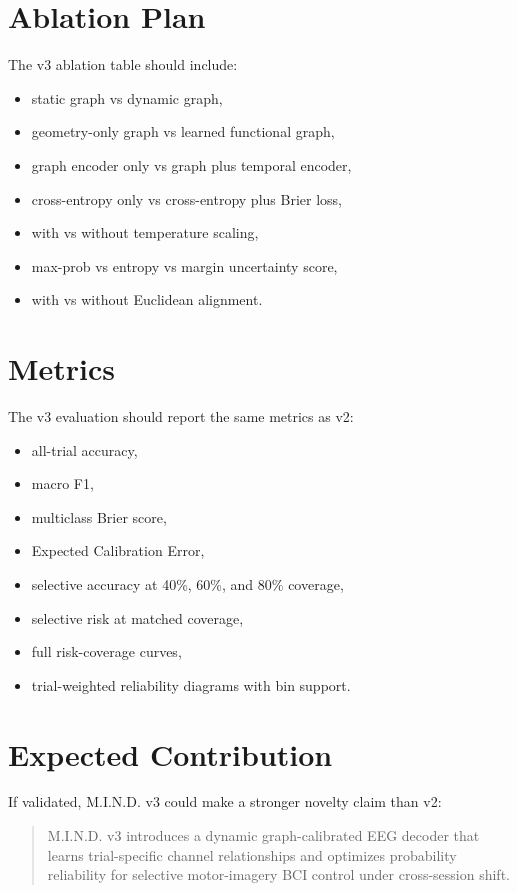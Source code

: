 \documentclass[11pt]{article}
\begin{document}
\section{Ablation Plan}

The v3 ablation table should include:
\begin{itemize}
  \item static graph vs dynamic graph,
  \item geometry-only graph vs learned functional graph,
  \item graph encoder only vs graph plus temporal encoder,
  \item cross-entropy only vs cross-entropy plus Brier loss,
  \item with vs without temperature scaling,
  \item max-prob vs entropy vs margin uncertainty score,
  \item with vs without Euclidean alignment.
\end{itemize}

\section{Metrics}

The v3 evaluation should report the same metrics as v2:
\begin{itemize}
  \item all-trial accuracy,
  \item macro F1,
  \item multiclass Brier score,
  \item Expected Calibration Error,
  \item selective accuracy at 40\%, 60\%, and 80\% coverage,
  \item selective risk at matched coverage,
  \item full risk-coverage curves,
  \item trial-weighted reliability diagrams with bin support.
\end{itemize}

\section{Expected Contribution}

If validated, M.I.N.D. v3 could make a stronger novelty claim than v2:
\begin{quote}
M.I.N.D. v3 introduces a dynamic graph-calibrated EEG decoder that learns
trial-specific channel relationships and optimizes probability reliability for
selective motor-imagery BCI control under cross-session shift.
\end{quote}
\end{document}
